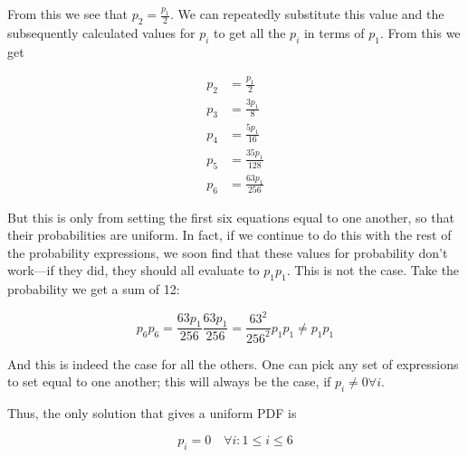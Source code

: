 \documentclass{article}
\begin{document}
From this we see that $p_2 = \frac{p_1}{2}$. We can repeatedly substitute this value and the subsequently calculated values for $p_i$ to get all the $p_i$ in terms of $p_1$. From this we get

\begin{align*}
  p_2 &= \frac{p_1}{2} \\
  p_3 &= \frac{3p_1}{8} \\
  p_4 &= \frac{5p_1}{16} \\
  p_5 &= \frac{35p_1}{128} \\
  p_6 &= \frac{63p_1}{256}
\end{align*}

But this is only from setting the first six equations equal to one another, so that their probabilities are uniform. In fact, if we continue to do this with the rest of the probability expressions, we soon find that these values for probability don't work---if they did, they should all evaluate to $p_1p_1$. This is not the case. Take the probability we get a sum of 12:

$$p_6p_6 = \frac{63p_1}{256}\frac{63p_1}{256} = \frac{63^2}{256^2}p_1p_1 \neq p_1p_1$$

And this is indeed the case for all the others. One can pick any set of expressions to set equal to one another; this will always be the case, if $p_i \neq 0 \forall i$.

Thus, the only solution that gives a uniform PDF is

$$p_i = 0 \quad \forall i : 1 \leq i \leq 6$$

\begin{comment}
Now all we need is 

$$\sum_{i=1}^6 p_i = 1$$

Which can write, using the previous results, as

\begin{align*}
  p_1 + \frac{p_1}{2} + \frac{3p_1}{8} + \frac{5p_1}{16} + \frac{35p_1}{128} + \frac{63p_1}{256} &= 1 \\
  p_1 &= \frac{1}{1} + \frac{1}{2} + \frac{3}{8} + \frac{5}{16} + \frac{35}{128} + \frac{63}{256} \\
  &= \frac{256}{693} \\
  &\approx 0.369
\end{align*}

And now that we have $p_1$, we can easily calculate the others:

\begin{align*}
  p_1 &= \frac{256}{693} \approx 0.369 \\
  p_2 &= \frac{128}{693} \approx 0.185 \\
  p_3 &= \frac{32}{231} \approx 0.139 \\
  p_4 &= \frac{80}{693} \approx 0.115 \\
  p_5 &= \frac{10}{99} \approx 0.101 \\
  p_6 &= \frac{1}{11} \approx 0.909 \\
\end{align*}

\end{comment}
\end{document}
